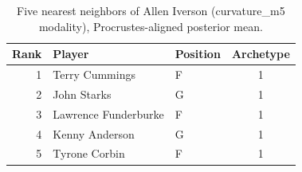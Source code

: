 \begin{table}[htbp]
  \centering\small
  \begin{tabular}{rllc}
    \toprule
    Rank & Player & Position & Archetype \\
    \midrule
    1 & Terry Cummings & F & 1 \\
    2 & John Starks & G & 1 \\
    3 & Lawrence Funderburke & F & 1 \\
    4 & Kenny Anderson & G & 1 \\
    5 & Tyrone Corbin & F & 1 \\
    \bottomrule
  \end{tabular}
  \caption{Five nearest neighbors of Allen Iverson (curvature_m5 modality), Procrustes-aligned posterior mean.}
  \label{tab:Allen_Iverson_neighbors_curvature_m5}
\end{table}

